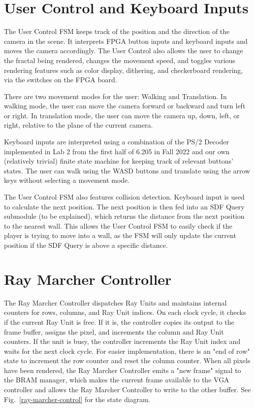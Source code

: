 \documentclass[conference]{IEEEtran}
\begin{document}

\section{User Control and Keyboard Inputs}

The User Control FSM keeps track of the position and the direction of the camera in the scene. It interprets FPGA button inputs and keyboard inputs and moves the camera accordingly. The User Control also allows the user to change the fractal being rendered, changes the movement speed, and toggles various rendering features such as color display, dithering, and checkerboard rendering, via the switches on the FPGA board.

There are two movement modes for the user: Walking and Translation. In walking mode, the user can move the camera forward or backward and turn left or right. In translation mode, the user can move the camera up, down, left, or right, relative to the plane of the current camera.

Keyboard inputs are interpreted using a combination of the PS/2 Decoder implemented in Lab 2 from the first half of 6.205 in Fall 2022 and our own (relatively trivial) finite state machine for keeping track of relevant buttons' states. The user can walk using the WASD buttons and translate using the arrow keys without selecting a movement mode.

The User Control FSM also features collision detection. Keyboard input is used to calculate the next position. The next position is then fed into an SDF Query submodule (to be explained), which returns the distance from the next position to the nearest wall. This allows the User Control FSM to easily check if the player is trying to move into a wall, as the FSM will only update the current position if the SDF Query is above a specific distance.


\section{Ray Marcher Controller}

The Ray Marcher Controller dispatches Ray Units and maintains internal counters for rows, columns, and Ray Unit indices. On each clock cycle, it checks if the current Ray Unit is free. If it is, the controller copies its output to the frame buffer, assigns the pixel, and increments the column and Ray Unit counters. If the unit is busy, the controller increments the Ray Unit index and waits for the next clock cycle. For easier implementation, there is an "end of row" state to increment the row counter and reset the column counter. When all pixels have been rendered, the Ray Marcher Controller emits a "new frame" signal to the BRAM manager, which makes the current frame available to the VGA controller and allows the Ray Marcher Controller to write to the other buffer. See Fig.~\ref{ray-marcher-control} for the state diagram.
\end{document}
